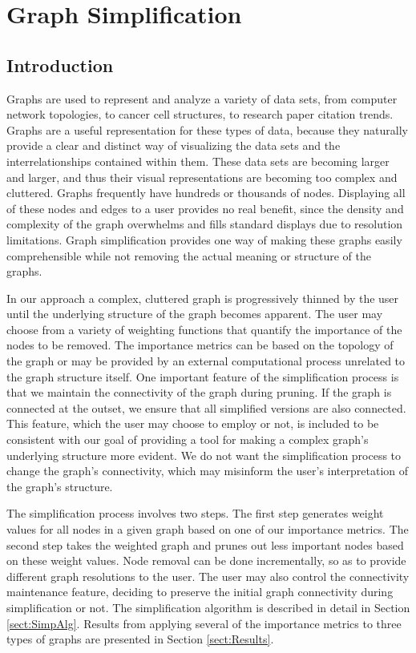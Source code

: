\chapter{Graph Simplification}
\section{Introduction} 
Graphs are used to represent and analyze a variety of data sets, from computer network topologies, to cancer cell structures, to research paper citation trends.  Graphs are a useful representation for these types of data, because they naturally provide a clear and distinct way of visualizing the data sets and the interrelationships contained within them.  These data sets are becoming larger and larger, and thus their visual representations are becoming too complex and cluttered.  Graphs frequently have hundreds or thousands of nodes.  Displaying all of these nodes and edges to a user provides no real benefit, since the density and complexity of the graph overwhelms and fills standard displays due to resolution limitations.  Graph simplification provides one way of making these graphs easily comprehensible while not removing the actual meaning or structure of the graphs.

In our approach a complex, cluttered graph is progressively thinned by the user until the underlying structure of the graph becomes apparent.  The user may choose from a variety of weighting functions that quantify the importance of the nodes to be removed.  The importance metrics can be based on the topology of the graph or may be provided by an external computational process unrelated to the graph structure itself.  One important feature of the simplification process is that we maintain the connectivity of the graph during pruning.  If the graph is connected at the outset, we ensure that all simplified versions are also connected.  This feature, which the user may choose to employ or not, is included to be consistent with our goal of providing a tool for making a complex graph's underlying structure more evident.  We do not want the simplification process to change the graph's connectivity, which may misinform the user's interpretation of the graph's structure.

The simplification process involves two steps.  The first step generates weight values for all nodes in a given graph based on one of our importance metrics.  The second step takes the weighted graph and prunes out less important nodes based on these weight values.  Node removal can be done incrementally, so as to provide different graph resolutions to the user.  The user may also control the connectivity maintenance feature, deciding to preserve the initial graph connectivity during simplification or not.  The simplification algorithm is described in detail in Section \ref{sect:SimpAlg}. Results from applying several of the importance metrics to three types of graphs are presented in Section \ref{sect:Results}.

